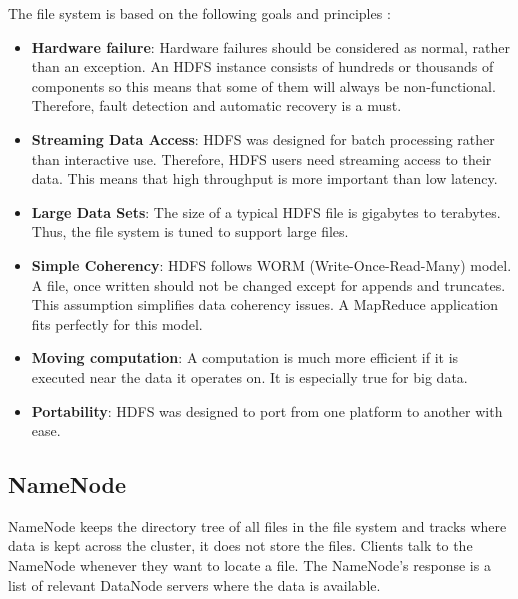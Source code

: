\noindent The file system is based on the following goals and principles \cite{HDFS-docs}:
\begin{itemize}
	\item \textbf{Hardware failure}: Hardware failures should be considered as normal, rather than an exception. An HDFS instance consists of hundreds or thousands of components so this means that some of them will always be non-functional. Therefore, fault detection and automatic recovery is a must.
	\item \textbf{Streaming Data Access}: HDFS was designed for batch processing rather than interactive use. Therefore, HDFS users need streaming access to their data. This means that high throughput is more important than low latency.
	\item \textbf{Large Data Sets}: The size of a typical HDFS file is gigabytes to terabytes. Thus, the file system is tuned to support large files. 
	\item \textbf{Simple Coherency}: HDFS follows WORM (Write-Once-Read-Many) model. A file, once written should not be changed except for appends and truncates.  This assumption simplifies data coherency issues. A MapReduce application fits perfectly for this model.
	\item \textbf{Moving computation}: A computation is much more efficient if it is executed near the data it operates on. It is especially true for big data. 
	\item \textbf{Portability}: HDFS was designed to port from one platform to another with ease. 
\end{itemize}

\subsection{NameNode}
NameNode keeps the directory tree of all files in the file system and tracks where data is kept across the cluster, it does not store the files. Clients talk to the NameNode whenever they want to locate a file. The NameNode's response is a list of relevant DataNode servers where the data is available. 

